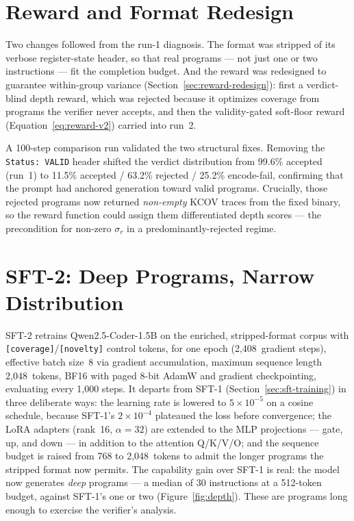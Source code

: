 \section{Reward and Format Redesign}
\label{sec:reward-validation}

Two changes followed from the run-1 diagnosis. The format was stripped of its
verbose register-state header, so that real programs --- not just one or two
instructions --- fit the completion budget. And the reward was redesigned to
guarantee within-group variance (Section~\ref{sec:reward-redesign}): first a
verdict-blind depth reward, which was rejected because it optimizes coverage from
programs the verifier never accepts, and then the validity-gated soft-floor reward
(Equation~\ref{eq:reward-v2}) carried into run~2.

A 100-step comparison run validated the two structural fixes. Removing the
\texttt{Status:~VALID} header shifted the verdict distribution from 99.6\% accepted
(run~1) to 11.5\% accepted / 63.2\% rejected / 25.2\% encode-fail, confirming that
the prompt had anchored generation toward valid programs. Crucially, those rejected
programs now returned \emph{non-empty} KCOV traces from the fixed binary, so the
reward function could assign them differentiated depth scores --- the precondition
for non-zero $\sigma_r$ in a predominantly-rejected regime.

\section{SFT-2: Deep Programs, Narrow Distribution}
\label{sec:results-sft2}

SFT-2 retrains Qwen2.5-Coder-1.5B on the enriched, stripped-format corpus with
\texttt{[coverage]}/\texttt{[novelty]} control tokens, for one epoch
(2{,}408~gradient steps), effective batch size~8 via gradient accumulation, maximum
sequence length 2{,}048~tokens, BF16 with paged 8-bit AdamW and gradient
checkpointing, evaluating every 1{,}000 steps. It departs from SFT-1
(Section~\ref{sec:sft-training}) in three deliberate ways: the learning rate is
lowered to $5\times10^{-5}$ on a cosine schedule, because SFT-1's
$2\times10^{-4}$ plateaued the loss before convergence; the LoRA adapters
(rank~16, $\alpha=32$) are extended to the MLP projections --- gate, up, and down ---
in addition to the attention Q/K/V/O; and the sequence budget is raised from 768 to
2{,}048~tokens to admit the longer programs the stripped format now permits.
The capability gain over SFT-1 is real: the model now generates
\emph{deep} programs --- a median of 30 instructions at a 512-token budget, against
SFT-1's one or two (Figure~\ref{fig:depth}). These are programs long enough to
exercise the verifier's analysis.

